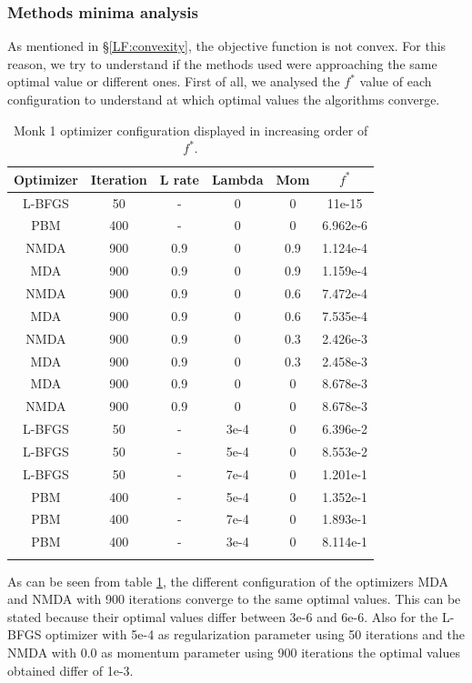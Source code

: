 \subsubsection{Methods minima analysis} 

As mentioned in \S\ref{LF:convexity}, the objective function is not convex. For this reason, we try to understand if the methods used were approaching the same optimal value or different ones.
First of all, we analysed the $f^{*}$ value of each configuration to understand at which optimal values the algorithms converge. 

\begin{longtable}{|c|c|c|c|c|c|}
	\hline
	\centering
	\textbf{Optimizer}&\textbf{Iteration} & \textbf{L rate} & \multicolumn{1}{l|}{\textbf{Lambda}} & \textbf{Mom} & \textbf{$f^{*}$} \\ \hline 
	L-BFGS & 50 & - & 0  & 0 & 11e-15  \\
	PBM & 400 & - & 0  & 0 & 6.962e-6 \\
	NMDA & 900 & 0.9 & 0  & 0.9 & 1.124e-4  \\
	MDA & 900 & 0.9 & 0  & 0.9 & 1.159e-4 \\
	NMDA & 900 & 0.9 & 0  & 0.6 & 7.472e-4  \\
	MDA & 900 & 0.9 & 0  & 0.6 & 7.535e-4 \\
	NMDA & 900 & 0.9 & 0  & 0.3 & 2.426e-3 \\
	MDA & 900 & 0.9 & 0  & 0.3 & 2.458e-3 \\
	MDA & 900 & 0.9 & 0  & 0 & 8.678e-3 \\
	NMDA & 900 & 0.9 & 0  & 0 & 8.678e-3 \\
	L-BFGS & 50 & - & 3e-4  & 0 & 6.396e-2 \\
	L-BFGS & 50 & - & 5e-4  & 0 & 8.553e-2 \\
	L-BFGS & 50 & - & 7e-4  & 0 & 1.201e-1 \\
	PBM & 400 & - & 5e-4  & 0 & 1.352e-1  \\
	PBM & 400 & - & 7e-4  & 0 & 1.893e-1  \\
	PBM & 400 & - & 3e-4  & 0 & 8.114e-1  \\
	\hline
	\caption{Monk 1 optimizer configuration displayed in increasing order of $f^*$.}
	\label{tab:nets_res_plots_Monk1}
\end{longtable}

As can be seen from table \ref{tab:nets_res_plots_Monk1}, the different configuration of the optimizers MDA and NMDA with 900 iterations converge to the same optimal values. This can be stated because their optimal values differ between 3e-6 and 6e-6. Also for the L-BFGS optimizer with 5e-4 as regularization parameter using 50 iterations and the NMDA with 0.0 as momentum parameter using 900 iterations the optimal values obtained differ of 1e-3.

